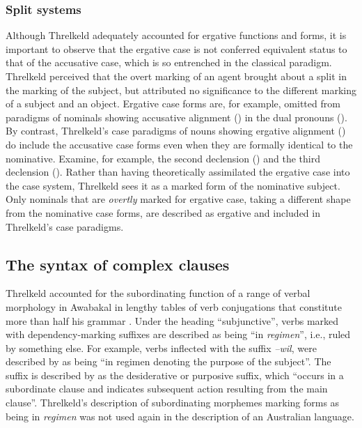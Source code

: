 \subsubsection{Split systems}
\label{sec:key:3.3.7.2}

Although Threlkeld adequately accounted for ergative functions and forms, it is important to observe that the ergative case is not conferred equivalent status to that of the accusative case, which is so entrenched in the classical paradigm. Threlkeld perceived that the overt marking of an agent brought about a split in the marking of the subject, but attributed no significance to the different marking of a subject and an object. Ergative case forms are, for example, omitted from paradigms of nominals showing accusative alignment () in the dual pronouns (). By contrast, Threlkeld’s case paradigms of nouns showing ergative alignment () do include the accusative case forms even when they are formally identical to the nominative. Examine, for example, the second declension () and the third declension (). Rather than having theoretically assimilated the ergative case into the case system, Threlkeld sees it as a marked form of the nominative subject. Only nominals that are \textit{overtly} marked for ergative case, taking a different shape from the nominative case forms, are described as ergative and included in Threlkeld’s case paradigms.

\subsection{The syntax of complex clauses}
\label{sec:key:3.3.8}

Threlkeld accounted for the subordinating function of a range of verbal morphology in Awabakal in lengthy tables of verb conjugations that constitute more than half his grammar \citep[33--77]{threlkeld_australian_1834}. Under the heading ``subjunctive'', verbs marked with dependency-marking suffixes are described as being “in \textit{regimen}”, i.e., ruled by something else. For example, verbs inflected with the suffix \textit{–wil}, were described by \citet[49]{threlkeld_australian_1834} as being “in regimen denoting the purpose of the subject”. The suffix is described by \citet[77]{lissarrague_salvage_2006} as the desiderative or purposive suffix, which “occurs in a subordinate clause and indicates subsequent action resulting from the main clause”. Threlkeld’s description of subordinating morphemes marking forms as being in \textit{regimen} was not used again in the description of an Australian language.

